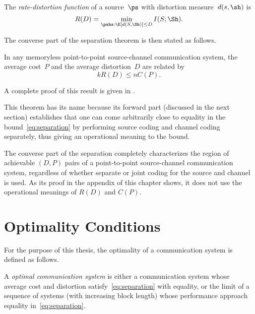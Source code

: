 \begin{definition}
  \label{def:ratedistortion}
  The \emph{rate-distortion function} of a source~$\ps$ with distortion
  measure~$d(s,\sh)$ is 
  \begin{equation*}
    R(D) = \min_{\pshs: \E[d(S,\Sh)] \le D} I(S;\Sh).
  \end{equation*}
\end{definition}

The converse part of the separation theorem is then stated as follows.

\begin{theorem}
  \label{thm:separationconverse}
  In any memoryless point-to-point source-channel communication system, the
  average cost~$P$ and the average distortion~$D$ are related by
  \begin{equation}
    \label{eq:separation}
    kR(D) \le nC(P).
  \end{equation}
\end{theorem}

A complete proof of this result is given in . 

This theorem has its name because its forward part (discussed in the next
section) establishes that one can come arbitrarily close to equality in the
bound~\eqref{eq:separation} by performing source coding and channel coding
separately, thus giving an operational meaning to the bound.

The converse part of the separation completely characterizes the region of
achievable $(D,P)$ pairs of a point-to-point source-channel communication
system, regardless of whether separate or joint coding for the source and
channel is used. As its proof in the appendix of this chapter shows, it does not
use the operational meanings of $R(D)$ and $C(P)$.


\section{Optimality Conditions}\label{sec:optimality}

For the purpose of this thesis, the optimality of a communication system is
defined as follows.

\begin{definition}
  \label{def:optimality}
  A \emph{optimal communication system} is either a communication system whose
  average cost and distortion satisfy~\eqref{eq:separation} with equality, or
  the limit of a sequence of systems (with increasing block length) whose
  performance approach equality in~\eqref{eq:separation}.
\end{definition}

